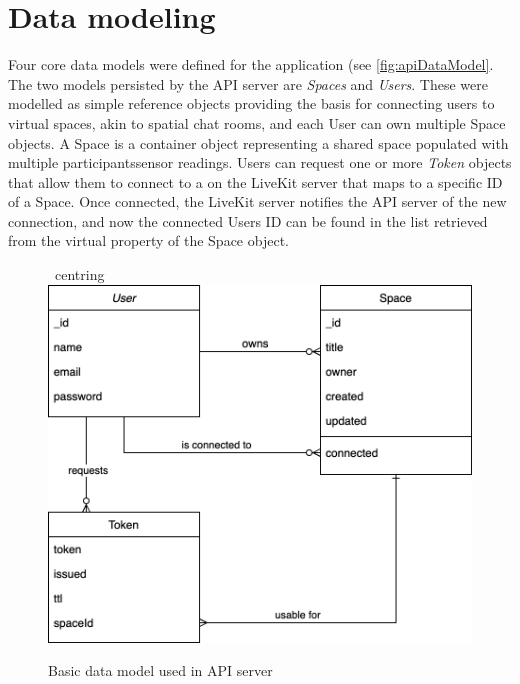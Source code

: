 \section{Data modeling}
\label{sec:datamodeling}

Four core data models were defined for the application (see \autoref{fig:apiDataModel}.
The two models persisted by the \ac{API} server are \emph{Spaces} and \emph{Users}.
These were modelled as simple reference objects providing the basis for connecting users to virtual spaces, akin to spatial chat rooms, and each User can own multiple Space objects.
A Space is a container object representing a shared space populated with multiple participants\textquotesingle sensor readings.
Users can request one or more \emph{Token} objects that allow them to connect to a  on the LiveKit server that maps to a specific ID of a Space.
Once connected, the LiveKit server notifies the \ac{API} server of the new connection, and now the connected User\textquotesingle s ID can be found in the list retrieved from the virtual  property of the Space object.

\begin{figure}[h]
\ centring
\includegraphics[scale=0.4]{04_Artefakte/01_Abbildungen/api-datamodel}
\caption[API data model]{Basic data model used in API server\protect}
\label{fig:apiDataModel}
\end{figure}

